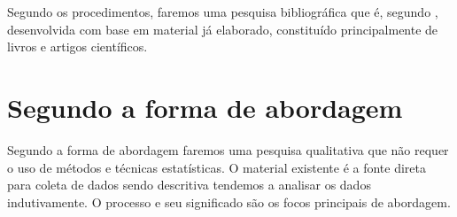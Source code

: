 Segundo os procedimentos, faremos uma pesquisa bibliográfica que é, segundo \cite{AntonioCarlosGil}, desenvolvida com base em  material já elaborado, constituído principalmente de livros e artigos científicos.

\section{Segundo a forma de abordagem}

Segundo a forma de abordagem faremos uma pesquisa qualitativa que não requer o uso de métodos e técnicas estatísticas. O material existente é a fonte direta para coleta de dados sendo 
descritiva tendemos a analisar os dados indutivamente. O processo e seu significado são os focos principais de abordagem. \cite{TatianaEng}

